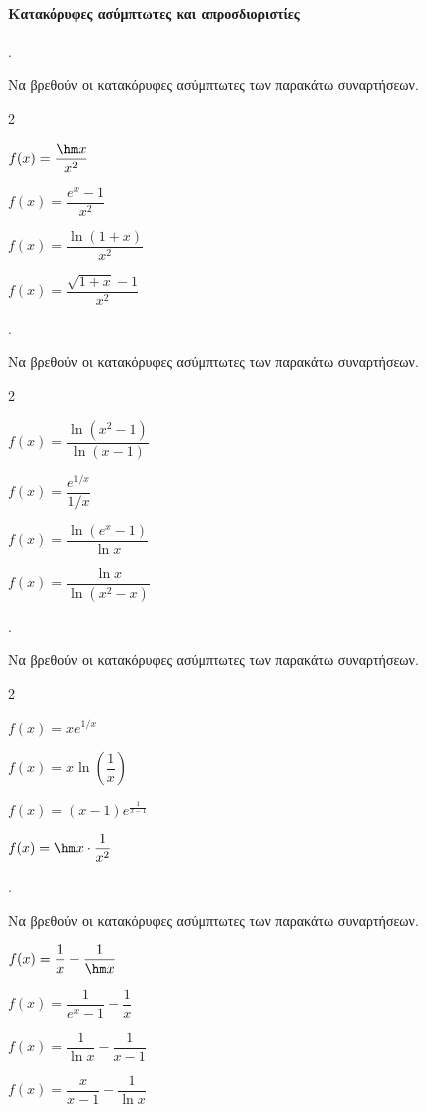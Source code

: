 \documentclass[11pt,a4paper,twocolumn]{article}
\newcounter{askhsh}
\newcommand{\askhsh}{\large\theaskhsh.\ \addtocounter{askhsh}{1}}
\begin{document}
\paragraph{Κατακόρυφες ασύμπτωτες και απροσδιοριστίες}
\askhsh Να βρεθούν οι κατακόρυφες ασύμπτωτες των παρακάτω συναρτήσεων.
\begin{multicols}{2}
\begin{alist}
\item $f(x)=\dfrac{\hm x}{x^2}$
\item $f(x)=\dfrac{e^x-1}{x^2}$
\item $f(x)=\dfrac{\ln(1+x)}{x^2}$
\item $f(x)=\dfrac{\sqrt{1+x}-1}{x^2}$
\end{alist}
\end{multicols}
\askhsh Να βρεθούν οι κατακόρυφες ασύμπτωτες των παρακάτω συναρτήσεων.
\begin{multicols}{2}
\begin{alist}
\item $f(x)=\dfrac{\ln(x^2-1)}{\ln(x-1)}$
\item $f(x)=\dfrac{e^{1/x}}{1/x}$
\item $f(x)=\dfrac{\ln(e^x-1)}{\ln x}$
\item $f(x)=\dfrac{\ln x}{\ln(x^2-x)}$
\end{alist}
\end{multicols}
\askhsh Να βρεθούν οι κατακόρυφες ασύμπτωτες των παρακάτω συναρτήσεων.
\begin{multicols}{2}
\begin{alist}
\item $f(x)=xe^{1/x}$
\item $f(x)=x\ln{\left(\dfrac{1}{x}\right)}$
\item $f(x)=(x-1)e^{\frac{1}{x-1}}$
\item $f(x)=\hm x \cdot \dfrac{1}{x^2}$
\end{alist}
\end{multicols}
\askhsh Να βρεθούν οι κατακόρυφες ασύμπτωτες των παρακάτω συναρτήσεων.
\begin{alist}
\item $f(x)=\dfrac{1}{x}-\dfrac{1}{\hm x}$
\item $f(x)=\dfrac{1}{e^x-1}-\dfrac{1}{x}$
\item $f(x)=\dfrac{1}{\ln x}-\dfrac{1}{x-1}$
\item $f(x)=\dfrac{x}{x-1}-\dfrac{1}{\ln x}$
\end{alist}
\end{document}
